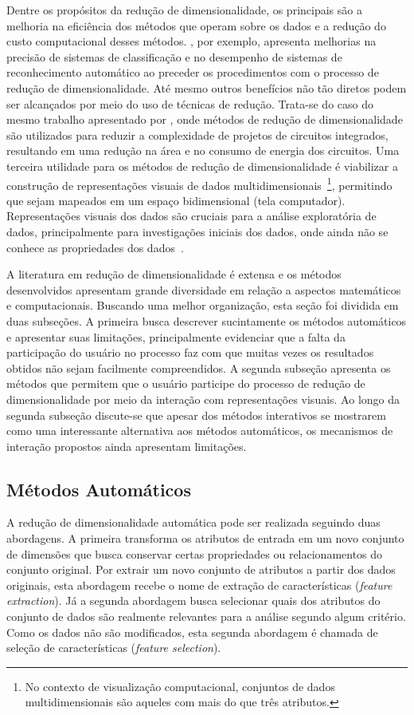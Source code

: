 Dentre os propósitos da redução de dimensionalidade, os
principais são a melhoria na eficiência dos métodos que
operam sobre os dados e a redução do custo computacional
desses métodos. \cite{Konig2000}, por exemplo, apresenta
melhorias na precisão de sistemas de classificação e no
desempenho de sistemas de reconhecimento automático ao
preceder os procedimentos com o processo de redução de
dimensionalidade. Até mesmo outros benefícios não tão
diretos podem ser alcançados por meio do uso de técnicas de
redução. Trata-se do caso do mesmo trabalho apresentado por
\citeauthor{Konig2000}, onde métodos de redução de
dimensionalidade são utilizados para reduzir a complexidade
de projetos de circuitos integrados, resultando em uma
redução na área e no consumo de energia dos circuitos. Uma
terceira utilidade para os métodos de redução de
dimensionalidade é viabilizar a construção de representações
visuais de dados multidimensionais~\footnote{No contexto de
visualização computacional, conjuntos de dados
multidimensionais são aqueles com mais do que três
atributos.}, permitindo que sejam mapeados em um espaço
bidimensional (tela computador).  Representações visuais dos
dados são cruciais para a análise exploratória de dados,
principalmente para investigações iniciais dos dados, onde
ainda não se conhece as propriedades dos
dados~\cite{Kaski2011}. 

A literatura em redução de dimensionalidade é extensa e os
métodos desenvolvidos apresentam grande diversidade em
relação a aspectos matemáticos e computacionais. Buscando
uma melhor organização, esta seção foi dividida em duas
subseções. A primeira busca descrever sucintamente os
métodos automáticos e apresentar suas limitações,
principalmente evidenciar que a falta da participação do
usuário no processo faz com que muitas vezes os resultados
obtidos não sejam facilmente compreendidos. A segunda
subseção apresenta os métodos que permitem que o usuário
participe do processo de redução de dimensionalidade por
meio da interação com representações visuais. Ao longo da
segunda subseção discute-se que apesar dos métodos
interativos se mostrarem como uma interessante alternativa
aos métodos automáticos,
os mecanismos de interação propostos ainda apresentam
limitações. 

\subsection{Métodos Automáticos}

A redução de dimensionalidade automática pode ser realizada
seguindo duas abordagens. A primeira transforma os atributos
de entrada em um novo conjunto de dimensões que busca
conservar certas propriedades ou relacionamentos do conjunto
original. Por extrair um novo conjunto de atributos a partir
dos dados originais, esta abordagem recebe o nome de
extração de características (\emph{feature extraction}). Já
a segunda abordagem busca selecionar quais dos atributos do
conjunto de dados são realmente relevantes para a análise
segundo algum critério. Como os dados não são modificados,
esta segunda abordagem é chamada de seleção de
características (\emph{feature selection}).

